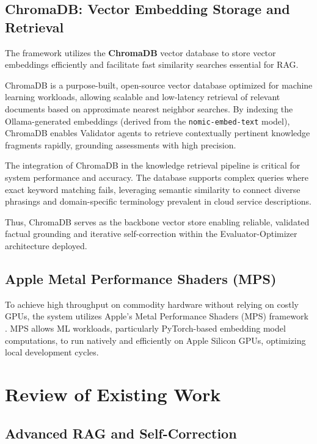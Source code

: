 \subsection{ChromaDB: Vector Embedding Storage and Retrieval}

The framework utilizes the \textbf{ChromaDB} vector database \cite{chromadb2024} to store vector embeddings efficiently and facilitate fast similarity searches essential for RAG.

ChromaDB is a purpose-built, open-source vector database optimized for machine learning workloads, allowing scalable and low-latency retrieval of relevant documents based on approximate nearest neighbor searches. By indexing the Ollama-generated embeddings (derived from the \texttt{nomic-embed-text} model), ChromaDB enables Validator agents to retrieve contextually pertinent knowledge fragments rapidly, grounding assessments with high precision.

The integration of ChromaDB in the knowledge retrieval pipeline is critical for system performance and accuracy. The database supports complex queries where exact keyword matching fails, leveraging semantic similarity to connect diverse phrasings and domain-specific terminology prevalent in cloud service descriptions.

Thus, ChromaDB serves as the backbone vector store enabling reliable, validated factual grounding and iterative self-correction within the Evaluator-Optimizer architecture deployed.

\subsection{Apple Metal Performance Shaders (MPS)}

To achieve high throughput on commodity hardware without relying on costly GPUs, the system utilizes Apple’s Metal Performance Shaders (MPS) framework \cite{apple2024mps}. MPS allows ML workloads, particularly PyTorch-based embedding model computations, to run natively and efficiently on Apple Silicon GPUs, optimizing local development cycles.

\section{Review of Existing Work}

\subsection{Advanced RAG and Self-Correction}

